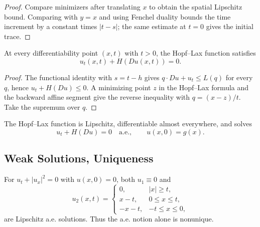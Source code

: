 \begin{proof}
\sketch Compare minimizers after translating $x$ to obtain the spatial
Lipschitz bound. Comparing with $y=x$ and using Fenchel duality bounds the
time increment by a constant times $|t-s|$; the same estimate at $t=0$ gives
the initial trace.
\end{proof}

\begin{theorem}
\label{thm:hopf-lax-solves-hj-equation}
At every differentiability point $(x,t)$ with $t>0$, the Hopf--Lax function
satisfies
\[
u_t(x,t)+H(Du(x,t))=0.
\]
\end{theorem}

\begin{proof}
\sketch The functional identity with $s=t-h$ gives
$q\cdot Du+u_t\le L(q)$ for every $q$, hence
$u_t+H(Du)\le0$. A minimizing point $z$ in the Hopf--Lax formula and the
backward affine segment give the reverse inequality with
$q=(x-z)/t$. Take the supremum over $q$.
\end{proof}

\begin{theorem}
\label{thm:hopf-lax-formula-as-solution}
The Hopf--Lax function is Lipschitz, differentiable almost everywhere, and
solves
\[
u_t+H(Du)=0\quad\text{a.e.},\qquad u(x,0)=g(x).
\]
\end{theorem}

\subsection{Weak Solutions, Uniqueness}
\label{sec:hj-weak-solutions-uniqueness}

\begin{example}
\label{ex:nonuniqueness-weak-solutions-hj}
For $u_t+|u_x|^2=0$ with $u(x,0)=0$, both $u_1\equiv0$ and
\[
u_2(x,t)=
\begin{cases}0,&|x|\ge t,\\x-t,&0\le x\le t,\\-x-t,&-t\le x\le0,
\end{cases}
\]
are Lipschitz a.e. solutions. Thus the a.e. notion alone is nonunique.
\end{example}

